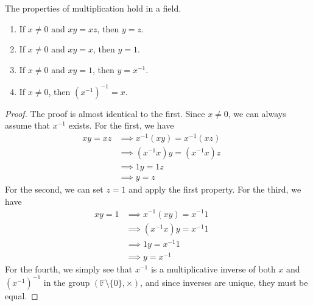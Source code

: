 \documentclass{article}
\begin{document}
      \begin{lemma}
        The properties of multiplication hold in a field. 
        \begin{enumerate}
          \item If $x \neq 0$ and $xy = xz$, then $y = z$. 
          \item If $x \neq 0$ and $xy = x$, then $y = 1$. 
          \item If $x \neq 0$ and $xy = 1$, then $y = x^{-1}$. 
          \item If $x \neq 0$, then $(x^{-1})^{-1} = x$. 
        \end{enumerate}
      \end{lemma}
      \begin{proof}
        The proof is almost identical to the first. Since $x \neq 0$, we can always assume that $x^{-1}$ exists. For the first, we have
        \begin{align}
          x y = x z & \implies x^{-1} (x y) = x^{-1} (x z) && \tag{multiplication is a function} \\
                    & \implies (x^{-1} x) y = (x^{-1} x) z && \tag{$\times$ is associative} \\
                    & \implies 1 y = 1 z && \tag{definition of multiplicative inverse} \\  
                    & \implies y = z && \tag{definition of identity}
        \end{align}
        For the second, we can set $z = 1$ and apply the first property. For the third, we have 
        \begin{align}
          xy = 1 & \implies x^{-1} (x y) = x^{-1} 1 && \tag{multiplication is a function} \\
                 & \implies (x^{-1} x) y = x^{-1} 1 && \tag{$\times$ is associative} \\
                 & \implies 1 y = x^{-1} 1 && \tag{definition of multiplicative inverse} \\
                 & \implies y = x^{-1} && \tag{definition of identity}
        \end{align}
        For the fourth, we simply see that $x^{-1}$ is a multiplicative inverse of both $x$ and $(x^{-1})^{-1}$ in the group $(\mathbb{F} \setminus \{0\}, \times)$, and since inverses are unique, they must be equal. 
      \end{proof}
\end{document}
